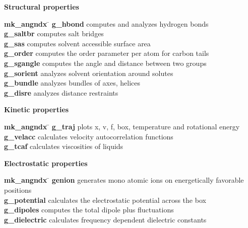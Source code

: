 \begin{description}
\item {\large\bf Structural properties}
\vspace{-2ex}\begin{tabbing}
{\bf mk\_angndx} \= \kill
{\bf g\_hbond} \> computes and analyzes hydrogen bonds \\
{\bf g\_saltbr} \> computes salt bridges \\
{\bf g\_sas} \> computes solvent accessible surface area \\
{\bf g\_order} \> computes the order parameter per atom for carbon tails \\
{\bf g\_sgangle} \> computes the angle and distance between two groups \\
{\bf g\_sorient} \> analyzes solvent orientation around solutes \\
{\bf g\_bundle} \> analyzes bundles of axes, {\eg} helices \\
{\bf g\_disre} \> analyzes distance restraints \\
\end{tabbing}\vspace{-2ex}

\item {\large\bf Kinetic properties}
\vspace{-2ex}\begin{tabbing}
{\bf mk\_angndx} \= \kill
{\bf g\_traj} \> plots x, v, f, box, temperature and rotational energy \\
{\bf g\_velacc} \> calculates velocity autocorrelation functions \\
{\bf g\_tcaf} \> calculates viscosities of liquids \\
\end{tabbing}\vspace{-2ex}

\item {\large\bf Electrostatic properties}
\vspace{-2ex}\begin{tabbing}
{\bf mk\_angndx} \= \kill
{\bf genion} \> generates mono atomic ions on energetically favorable positions \\
{\bf g\_potential} \> calculates the electrostatic potential across the box \\
{\bf g\_dipoles} \> computes the total dipole plus fluctuations \\
{\bf g\_dielectric} \> calculates frequency dependent dielectric constants \\
\end{tabbing}\vspace{-2ex}


\end{description}
